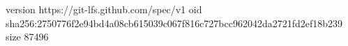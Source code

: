 version https://git-lfs.github.com/spec/v1
oid sha256:2750776f2e94bd4a08cb615039c067f816c727bcc962042da2721fd2ef18b239
size 87496
